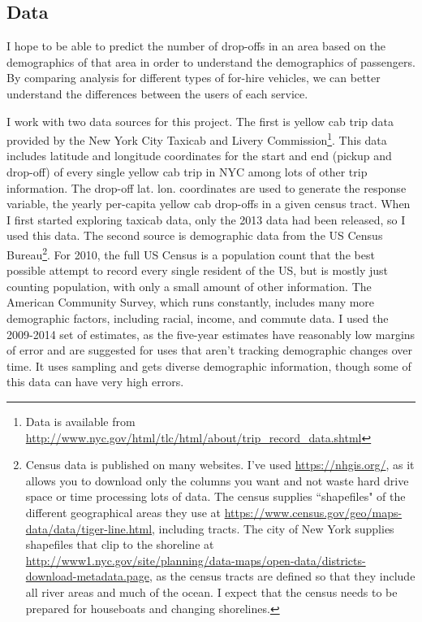 \documentclass[11pt]{article}
\begin{document}
\subsection{Data}

I hope to be able to predict the number of drop-offs in an area based on the demographics of that area in order to understand the demographics of passengers. 
By comparing analysis for different types of for-hire vehicles, we can better understand the differences between the users of each service.


I work with two data sources for this project.
The first is yellow cab trip data provided by the New York City Taxicab and Livery Commission\footnote{Data is available from \url{http://www.nyc.gov/html/tlc/html/about/trip_record_data.shtml} }. This data includes latitude and longitude coordinates for the start and end (pickup and drop-off) of every single yellow cab trip in NYC among lots of other trip information.
The drop-off lat. lon. coordinates are used to generate the response variable, the yearly per-capita yellow cab drop-offs in a given census tract.
When I first started exploring taxicab data, only the 2013 data had been released, so I used this data.
The second source is demographic data from the US Census Bureau\footnote{Census data is published on many websites. I've used \url{https://nhgis.org/}, as it allows you to download  only the columns you want and not waste hard drive space or time processing lots of data. The census supplies ``shapefiles" of the different geographical areas they use at \url{https://www.census.gov/geo/maps-data/data/tiger-line.html}, including tracts. The city of New York supplies shapefiles that clip to the shoreline at \url{http://www1.nyc.gov/site/planning/data-maps/open-data/districts-download-metadata.page}, as the census tracts are defined so that they include all river areas and much of the ocean. I expect that the census needs to be prepared for houseboats and changing shorelines.}.
For 2010, the full US Census is a population count that the best possible attempt to record every single resident of the US, but is mostly just counting population, with only a small amount of other information.
The American Community Survey, which runs constantly, includes many more demographic factors, including racial, income, and commute data. I used the 2009-2014 set of estimates, as the five-year estimates have reasonably low margins of error and are suggested for uses that aren't tracking demographic changes over time.
It uses sampling and gets diverse demographic information, though some of this data can have very high errors.
\end{document}
